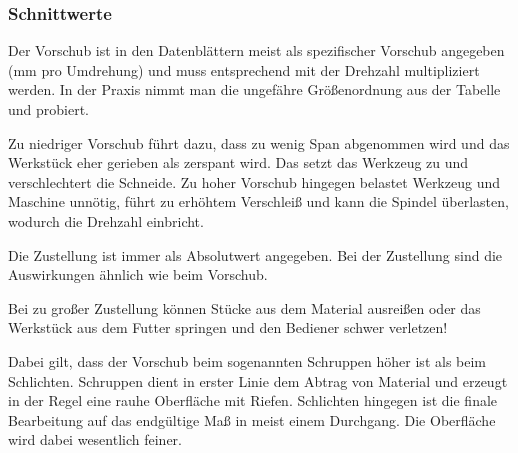 \documentclass{\basedir/fablab-document}
\begin{document}
\subsubsection{Schnittwerte}
\label{Schnittwerte}
Der Vorschub ist in den Datenblättern meist als spezifischer Vorschub angegeben (mm pro Umdrehung) und muss entsprechend mit der Drehzahl multipliziert werden.
In der Praxis nimmt man die ungefähre Größenordnung aus der Tabelle und probiert.

Zu niedriger Vorschub führt dazu, dass zu wenig Span abgenommen wird und das Werkstück eher gerieben als zerspant wird.
Das setzt das Werkzeug zu und verschlechtert die Schneide.
Zu hoher Vorschub hingegen belastet Werkzeug und Maschine unnötig,
führt zu erhöhtem Verschleiß und kann die Spindel überlasten, wodurch die Drehzahl einbricht.

Die Zustellung ist immer als Absolutwert angegeben.
Bei der Zustellung sind die Auswirkungen ähnlich wie beim Vorschub.

Bei zu großer Zustellung können Stücke aus dem Material ausreißen oder das Werkstück aus dem Futter
springen und den Bediener schwer verletzen!

Dabei gilt, dass der Vorschub beim sogenannten Schruppen höher ist als beim Schlichten.
Schruppen dient in erster Linie dem Abtrag von Material und erzeugt in der Regel eine rauhe Oberfläche mit Riefen.
Schlichten hingegen ist die finale Bearbeitung auf das endgültige Maß in meist einem Durchgang.
Die Oberfläche wird dabei wesentlich feiner. 
\end{document}
